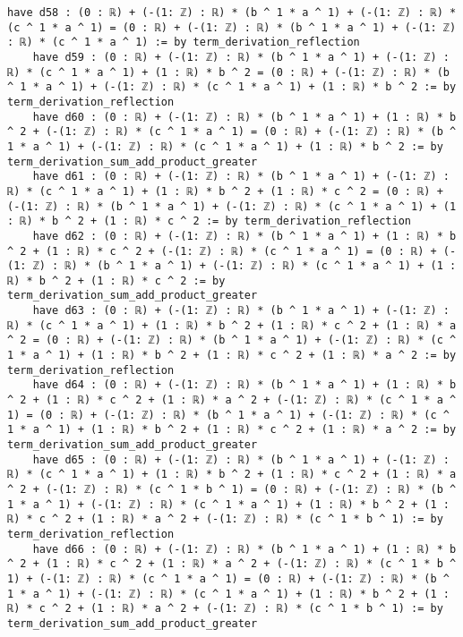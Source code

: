 \documentclass{article}
\begin{document}
\begin{tcolorbox}[colback=white!10, width=\linewidth]
\begin{lstlisting}[language=Lean4]
    have d58 : (0 : ℝ) + (-(1: ℤ) : ℝ) * (b ^ 1 * a ^ 1) + (-(1: ℤ) : ℝ) * (c ^ 1 * a ^ 1) = (0 : ℝ) + (-(1: ℤ) : ℝ) * (b ^ 1 * a ^ 1) + (-(1: ℤ) : ℝ) * (c ^ 1 * a ^ 1) := by term_derivation_reflection
    have d59 : (0 : ℝ) + (-(1: ℤ) : ℝ) * (b ^ 1 * a ^ 1) + (-(1: ℤ) : ℝ) * (c ^ 1 * a ^ 1) + (1 : ℝ) * b ^ 2 = (0 : ℝ) + (-(1: ℤ) : ℝ) * (b ^ 1 * a ^ 1) + (-(1: ℤ) : ℝ) * (c ^ 1 * a ^ 1) + (1 : ℝ) * b ^ 2 := by term_derivation_reflection
    have d60 : (0 : ℝ) + (-(1: ℤ) : ℝ) * (b ^ 1 * a ^ 1) + (1 : ℝ) * b ^ 2 + (-(1: ℤ) : ℝ) * (c ^ 1 * a ^ 1) = (0 : ℝ) + (-(1: ℤ) : ℝ) * (b ^ 1 * a ^ 1) + (-(1: ℤ) : ℝ) * (c ^ 1 * a ^ 1) + (1 : ℝ) * b ^ 2 := by term_derivation_sum_add_product_greater
    have d61 : (0 : ℝ) + (-(1: ℤ) : ℝ) * (b ^ 1 * a ^ 1) + (-(1: ℤ) : ℝ) * (c ^ 1 * a ^ 1) + (1 : ℝ) * b ^ 2 + (1 : ℝ) * c ^ 2 = (0 : ℝ) + (-(1: ℤ) : ℝ) * (b ^ 1 * a ^ 1) + (-(1: ℤ) : ℝ) * (c ^ 1 * a ^ 1) + (1 : ℝ) * b ^ 2 + (1 : ℝ) * c ^ 2 := by term_derivation_reflection
    have d62 : (0 : ℝ) + (-(1: ℤ) : ℝ) * (b ^ 1 * a ^ 1) + (1 : ℝ) * b ^ 2 + (1 : ℝ) * c ^ 2 + (-(1: ℤ) : ℝ) * (c ^ 1 * a ^ 1) = (0 : ℝ) + (-(1: ℤ) : ℝ) * (b ^ 1 * a ^ 1) + (-(1: ℤ) : ℝ) * (c ^ 1 * a ^ 1) + (1 : ℝ) * b ^ 2 + (1 : ℝ) * c ^ 2 := by term_derivation_sum_add_product_greater
    have d63 : (0 : ℝ) + (-(1: ℤ) : ℝ) * (b ^ 1 * a ^ 1) + (-(1: ℤ) : ℝ) * (c ^ 1 * a ^ 1) + (1 : ℝ) * b ^ 2 + (1 : ℝ) * c ^ 2 + (1 : ℝ) * a ^ 2 = (0 : ℝ) + (-(1: ℤ) : ℝ) * (b ^ 1 * a ^ 1) + (-(1: ℤ) : ℝ) * (c ^ 1 * a ^ 1) + (1 : ℝ) * b ^ 2 + (1 : ℝ) * c ^ 2 + (1 : ℝ) * a ^ 2 := by term_derivation_reflection
    have d64 : (0 : ℝ) + (-(1: ℤ) : ℝ) * (b ^ 1 * a ^ 1) + (1 : ℝ) * b ^ 2 + (1 : ℝ) * c ^ 2 + (1 : ℝ) * a ^ 2 + (-(1: ℤ) : ℝ) * (c ^ 1 * a ^ 1) = (0 : ℝ) + (-(1: ℤ) : ℝ) * (b ^ 1 * a ^ 1) + (-(1: ℤ) : ℝ) * (c ^ 1 * a ^ 1) + (1 : ℝ) * b ^ 2 + (1 : ℝ) * c ^ 2 + (1 : ℝ) * a ^ 2 := by term_derivation_sum_add_product_greater
    have d65 : (0 : ℝ) + (-(1: ℤ) : ℝ) * (b ^ 1 * a ^ 1) + (-(1: ℤ) : ℝ) * (c ^ 1 * a ^ 1) + (1 : ℝ) * b ^ 2 + (1 : ℝ) * c ^ 2 + (1 : ℝ) * a ^ 2 + (-(1: ℤ) : ℝ) * (c ^ 1 * b ^ 1) = (0 : ℝ) + (-(1: ℤ) : ℝ) * (b ^ 1 * a ^ 1) + (-(1: ℤ) : ℝ) * (c ^ 1 * a ^ 1) + (1 : ℝ) * b ^ 2 + (1 : ℝ) * c ^ 2 + (1 : ℝ) * a ^ 2 + (-(1: ℤ) : ℝ) * (c ^ 1 * b ^ 1) := by term_derivation_reflection
    have d66 : (0 : ℝ) + (-(1: ℤ) : ℝ) * (b ^ 1 * a ^ 1) + (1 : ℝ) * b ^ 2 + (1 : ℝ) * c ^ 2 + (1 : ℝ) * a ^ 2 + (-(1: ℤ) : ℝ) * (c ^ 1 * b ^ 1) + (-(1: ℤ) : ℝ) * (c ^ 1 * a ^ 1) = (0 : ℝ) + (-(1: ℤ) : ℝ) * (b ^ 1 * a ^ 1) + (-(1: ℤ) : ℝ) * (c ^ 1 * a ^ 1) + (1 : ℝ) * b ^ 2 + (1 : ℝ) * c ^ 2 + (1 : ℝ) * a ^ 2 + (-(1: ℤ) : ℝ) * (c ^ 1 * b ^ 1) := by term_derivation_sum_add_product_greater

\end{lstlisting}
\end{tcolorbox}
\end{document}
